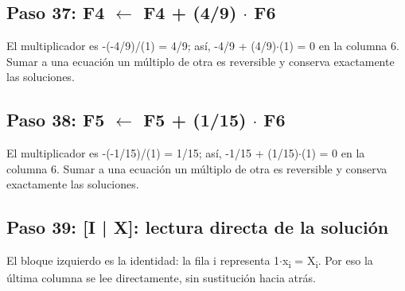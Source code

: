 \documentclass[conference]{IEEEtran}
\begin{document}
\medskip
\subsection*{Paso 37: F4 \(\leftarrow\) F4 + (4/9) \(\cdot\) F6}
El multiplicador es -(-4/9)/(1) = 4/9; así, -4/9 + (4/9)\(\cdot\)(1) = 0 en la columna 6. Sumar a una ecuación un múltiplo de otra es reversible y conserva exactamente las soluciones.


\medskip
\subsection*{Paso 38: F5 \(\leftarrow\) F5 + (1/15) \(\cdot\) F6}
El multiplicador es -(-1/15)/(1) = 1/15; así, -1/15 + (1/15)\(\cdot\)(1) = 0 en la columna 6. Sumar a una ecuación un múltiplo de otra es reversible y conserva exactamente las soluciones.


\medskip
\subsection*{Paso 39: [I | X]: lectura directa de la solución}
El bloque izquierdo es la identidad: la fila i representa 1\(\cdot\)x\textsubscript{i} = X\textsubscript{i}. Por eso la última columna se lee directamente, sin sustitución hacia atrás.
\end{document}
